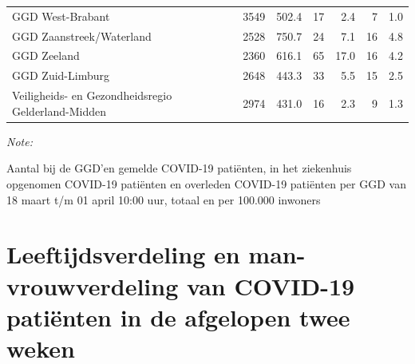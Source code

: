 \documentclass[
  english,
  man,floatsintext]{apa6}
\begin{document}
\begin{table}
\begin{threeparttable}
\begin{tabular}{lrrrrrr}
GGD West-Brabant & 3549 & 502.4 & 17 & 2.4 & 7 & 1.0\\
GGD Zaanstreek/Waterland & 2528 & 750.7 & 24 & 7.1 & 16 & 4.8\\
GGD Zeeland & 2360 & 616.1 & 65 & 17.0 & 16 & 4.2\\
GGD Zuid-Limburg & 2648 & 443.3 & 33 & 5.5 & 15 & 2.5\\
Veiligheids- en Gezondheidsregio Gelderland-Midden & 2974 & 431.0 & 16 & 2.3 & 9 & 1.3\\
\bottomrule
\end{tabular}
\begin{tablenotes}
\item \textit{Note: } 
\item Aantal bij de GGD’en gemelde COVID-19 patiënten, in het ziekenhuis opgenomen COVID-19 patiënten en overleden COVID-19 patiënten per GGD van 18 maart t/m 01 april 10:00 uur, totaal en per 100.000 inwoners
\end{tablenotes}
\end{threeparttable}
\endgroup{}
\end{table}

\newpage

\hypertarget{leeftijdsverdeling-en-man-vrouwverdeling-van-covid-19-patiuxebnten-in-de-afgelopen-twee-weken}{%
\section{Leeftijdsverdeling en man-vrouwverdeling van COVID-19 patiënten in de afgelopen twee weken}\label{leeftijdsverdeling-en-man-vrouwverdeling-van-covid-19-patiuxebnten-in-de-afgelopen-twee-weken}}
\end{document}
